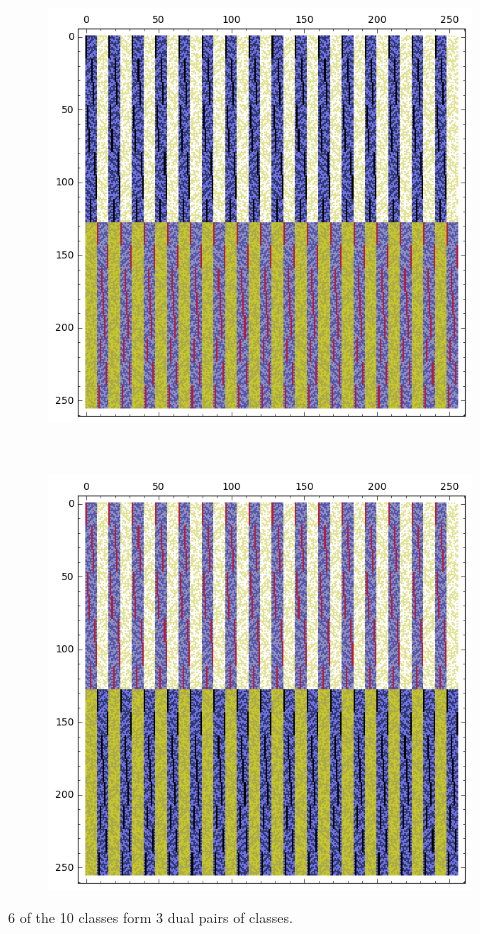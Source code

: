 \documentclass[12pt,a4paper]{article}
\begin{document}
\begin{figure}[!bhpt] %
\centering
\begin{minipage}{.48\textwidth}
  \centering
  \includegraphics[width=.9\linewidth]{../matrix_plot/re8_10_bent_cayley_graph_index_matrix.png}
  \label{fig:c8_10_bent_cayley_graph_index_matrix}
\end{minipage}
~~
\begin{minipage}{.48\textwidth}
  \centering
  \includegraphics[width=.9\linewidth]{../matrix_plot/re8_10_dual_cayley_graph_index_matrix.png}
  \label{fig:c8_10_dual_cayley_graph_index_matrix}
\end{minipage}%
\end{figure}
6 of the 10 classes form 3 dual pairs of classes.
\end{document}
